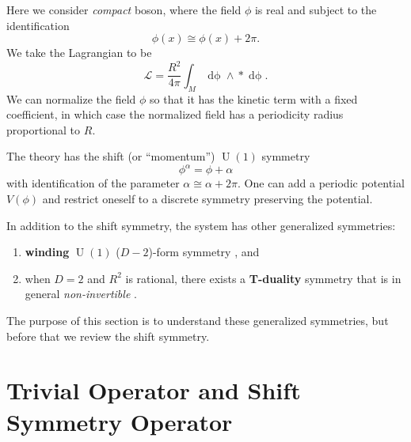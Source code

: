 \documentclass[
  letterpaper,
  DIV=11,
  numbers=noendperiod]{scrreport}
\providecommand{\tightlist}{%
  \setlength{\itemsep}{0pt}\setlength{\parskip}{0pt}}\usepackage{longtable,booktabs,array}
\DeclareMathOperator{\U}{U}
\newcommand{\stdim}{D}
\begin{document}
Here we consider \emph{compact} boson, where the field \(\phi\) is real
and subject to the identification \[
\phi(x) \cong \phi(x) + 2\pi.
\] We take the Lagrangian to be \[
\mathcal{L} = \frac{R^2}{4\pi}\int_M \mathop{d\phi} \wedge \mathop{*}\mathop{d\phi}.
\] We can normalize the field \(\phi\) so that it has the kinetic term
with a fixed coefficient, in which case the normalized field has a
periodicity radius proportional to \(R\).

The theory has the shift (or ``momentum'') \(\U(1)\) symmetry \[
\phi^\alpha = \phi + \alpha 
\] with identification of the parameter \(\alpha \cong \alpha + 2\pi\).
One can add a periodic potential \(V(\phi)\) and restrict oneself to a
discrete symmetry preserving the potential.

In addition to the shift symmetry, the system has other generalized
symmetries:

\begin{enumerate}
\def\labelenumi{\arabic{enumi}.}
\tightlist
\item
  \textbf{winding} \(\U(1)\) (\(\stdim-2\))-form symmetry
  \autocite{Gaiotto:2014kfa}, and
\item
  when \(\stdim=2\) and \(R^2\) is rational, there exists a
  \textbf{T-duality} symmetry that is in general \emph{non-invertible}
  \autocites{Choi:2021kmx}{Niro:2022ctq}{Cordova:2023ent,Nagoya:2023zky}.
\end{enumerate}

The purpose of this section is to understand these generalized
symmetries, but before that we review the shift symmetry.

\hypertarget{trivial-operator-and-shift-symmetry-operator}{%
\section{Trivial Operator and Shift Symmetry
Operator}\label{trivial-operator-and-shift-symmetry-operator}}
\end{document}
